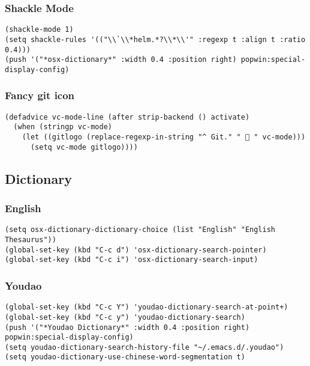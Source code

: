 \documentclass[11pt]{article}
\begin{document}
\subsubsection{Shackle Mode}
\label{sec:orgheadline19}
\begin{verbatim}
(shackle-mode 1)
(setq shackle-rules '(("\\`\\*helm.*?\\*\\'" :regexp t :align t :ratio 0.4)))
(push '("*osx-dictionary*" :width 0.4 :position right) popwin:special-display-config)
\end{verbatim}
\subsubsection{Fancy git icon}
\label{sec:orgheadline20}
\begin{verbatim}
(defadvice vc-mode-line (after strip-backend () activate)
  (when (stringp vc-mode)
    (let ((gitlogo (replace-regexp-in-string "^ Git." "  " vc-mode)))
      (setq vc-mode gitlogo))))
\end{verbatim}
\subsection{Dictionary}
\label{sec:orgheadline24}
\subsubsection{English}
\label{sec:orgheadline22}
\begin{verbatim}
(setq osx-dictionary-dictionary-choice (list "English" "English Thesaurus"))
(global-set-key (kbd "C-c d") 'osx-dictionary-search-pointer)
(global-set-key (kbd "C-c i") 'osx-dictionary-search-input)
\end{verbatim}
\subsubsection{Youdao}
\label{sec:orgheadline23}
\begin{verbatim}
(global-set-key (kbd "C-c Y") 'youdao-dictionary-search-at-point+)
(global-set-key (kbd "C-c y") 'youdao-dictionary-search)
(push '("*Youdao Dictionary*" :width 0.4 :position right) popwin:special-display-config)
(setq youdao-dictionary-search-history-file "~/.emacs.d/.youdao")
(setq youdao-dictionary-use-chinese-word-segmentation t)
\end{verbatim}
\end{document}
